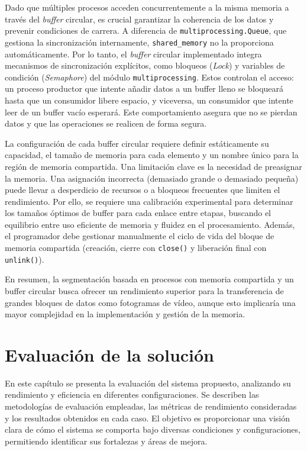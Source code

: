 \documentclass[11pt,spanish,listoffigures,listoftables]{tfgetsinf}
\begin{document}
Dado que múltiples procesos acceden concurrentemente a la misma memoria a través del \textit{buffer} circular, es crucial garantizar la coherencia de los datos y prevenir condiciones de carrera. A diferencia de \texttt{multiprocessing.Queue}, que gestiona la sincronización internamente, \texttt{shared\_memory} no la proporciona automáticamente. Por lo tanto, el \textit{buffer} circular implementado integra mecanismos de sincronización explícitos, como bloqueos (\textit{Lock}) y variables de condición (\textit{Semaphore}) del módulo \texttt{multiprocessing}. Estos controlan el acceso: un proceso productor que intente añadir datos a un buffer lleno se bloqueará hasta que un consumidor libere espacio, y viceversa, un consumidor que intente leer de un buffer vacío esperará. Este comportamiento asegura que no se pierdan datos y que las operaciones se realicen de forma segura.

La configuración de cada buffer circular requiere definir estáticamente su capacidad, el tamaño de memoria para cada elemento y un nombre único para la región de memoria compartida. Una limitación clave es la necesidad de preasignar la memoria. Una asignación incorrecta (demasiado grande o demasiado pequeña) puede llevar a desperdicio de recursos o a bloqueos frecuentes que limiten el rendimiento. Por ello, se requiere una calibración experimental para determinar los tamaños óptimos de buffer para cada enlace entre etapas, buscando el equilibrio entre uso eficiente de memoria y fluidez en el procesamiento. Además, el programador debe gestionar manualmente el ciclo de vida del bloque de memoria compartida (creación, cierre con \texttt{close()} y liberación final con \texttt{unlink()}).

En resumen, la segmentación basada en procesos con memoria compartida y un buffer circular busca ofrecer un rendimiento superior para la transferencia de grandes bloques de datos como fotogramas de vídeo, aunque esto implicaría una mayor complejidad en la implementación y gestión de la memoria.


\chapter{Evaluación de la solución} \label{chap:evaluacion_solucion}

En este capítulo se presenta la evaluación del sistema propuesto, analizando su rendimiento y eficiencia en diferentes configuraciones. Se describen las metodologías de evaluación empleadas, las métricas de rendimiento consideradas y los resultados obtenidos en cada caso. El objetivo es proporcionar una visión clara de cómo el sistema se comporta bajo diversas condiciones y configuraciones, permitiendo identificar sus fortalezas y áreas de mejora.
\end{document}
